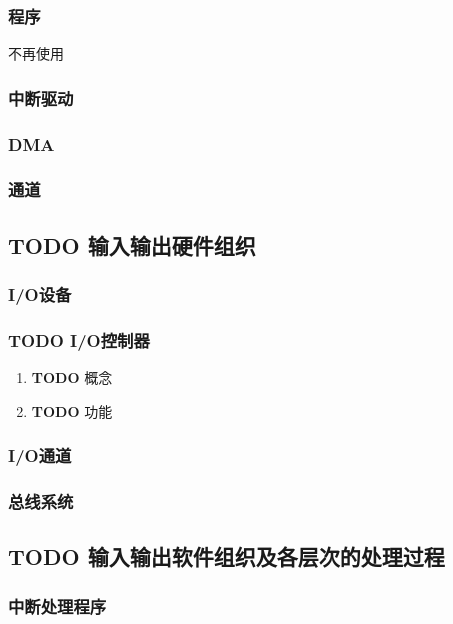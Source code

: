 \documentclass[11pt]{article}
\begin{document}
\subsubsection{程序}
\label{sec-5-1-1}
不再使用
\subsubsection{中断驱动}
\label{sec-5-1-2}
\subsubsection{DMA}
\label{sec-5-1-3}
\subsubsection{通道}
\label{sec-5-1-4}
\subsection{{\bfseries\sffamily TODO} 输入输出硬件组织}
\label{sec-5-2}
\subsubsection{I/O设备}
\label{sec-5-2-1}
\subsubsection{{\bfseries\sffamily TODO} I/O控制器}
\label{sec-5-2-2}
\begin{enumerate}
\item {\bfseries\sffamily TODO} 概念
\label{sec-5-2-2-1}
\item {\bfseries\sffamily TODO} 功能
\label{sec-5-2-2-2}
\end{enumerate}
\subsubsection{I/O通道}
\label{sec-5-2-3}
\subsubsection{总线系统}
\label{sec-5-2-4}
\subsection{{\bfseries\sffamily TODO} 输入输出软件组织及各层次的处理过程}
\label{sec-5-3}
\subsubsection{中断处理程序}
\label{sec-5-3-1}
\end{document}
